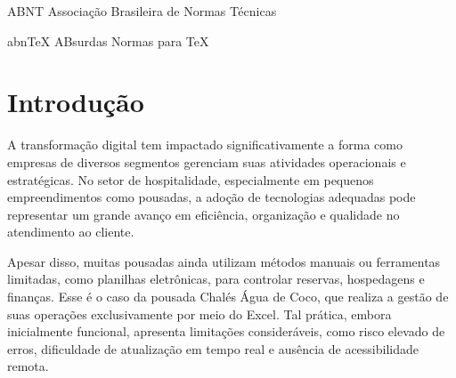 \documentclass[
	12pt,				%
	openany,			%
	twoside,			%
	a4paper,			%
	english,			%
	french,				%
	spanish,			%
	brazil				%
	]{abntex2}
\renewcommand*{\cleardoublepage}{\clearpage}
\newcommand{\listofquadrosname}{Lista de quadros}
\begin{document}
\listoffigures*
\cleardoublepage
\pdfbookmark[0]{\listofquadrosname}{loq}
\listofquadros*
\cleardoublepage
\listoftables*
\cleardoublepage
\begin{siglas}
  \item[ABNT] Associação Brasileira de Normas Técnicas
  \item[abnTeX] ABsurdas Normas para TeX
\end{siglas}

\tableofcontents*
\cleardoublepage



\textual

\chapter{Introdução}

A transformação digital tem impactado significativamente a forma como empresas de diversos segmentos gerenciam suas atividades operacionais e estratégicas. No setor de hospitalidade, especialmente em pequenos empreendimentos como pousadas, a adoção de tecnologias adequadas pode representar um grande avanço em eficiência, organização e qualidade no atendimento ao cliente.

Apesar disso, muitas pousadas ainda utilizam métodos manuais ou ferramentas limitadas, como planilhas eletrônicas, para controlar reservas, hospedagens e finanças. Esse é o caso da pousada Chalés Água de Coco, que realiza a gestão de suas operações exclusivamente por meio do Excel. Tal prática, embora inicialmente funcional, apresenta limitações consideráveis, como risco elevado de erros, dificuldade de atualização em tempo real e ausência de acessibilidade remota.
\end{document}
